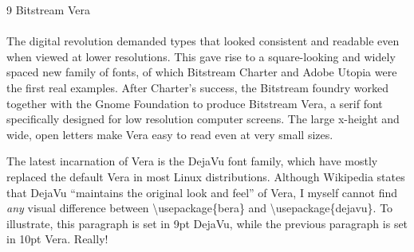 \documentclass{article}
\begin{document}
\frenchspacing
\noindent
{\LARGE 9 Bitstream Vera}\\
~\\
The digital revolution demanded types that looked consistent and readable even when viewed at lower resolutions. This gave rise to a square-looking and widely spaced new family of fonts, of which Bitstream Charter and Adobe Utopia were the first real examples. After Charter's success, the Bitstream foundry worked together with the Gnome Foundation to produce Bitstream Vera, a serif font specifically designed for low resolution computer screens. The large x-height and wide, open letters make Vera easy to read even at very small sizes.

\fontsize{9pt}{1em}
{\selectfont
The latest incarnation of Vera is the DejaVu font family, which have mostly replaced the default Vera in most Linux distributions. Although Wikipedia states that DejaVu ``maintains the original look and feel'' of Vera, I myself cannot find \emph{any} visual difference between \textbackslash{}usepackage\{bera\} and \textbackslash{}usepackage\{dejavu\}. To illustrate, this paragraph is set in 9pt DejaVu, while the previous paragraph is set in 10pt Vera. Really!
}
\end{document}
